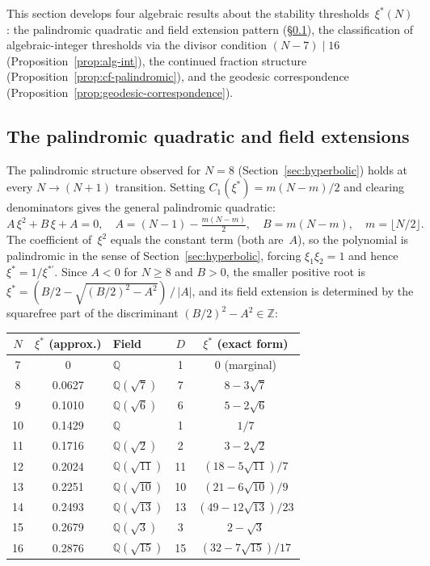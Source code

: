 This section develops four algebraic results about the
stability thresholds~$\xi^*(N)$: the palindromic quadratic
and field extension pattern (\S\ref{sec:palindromic-quad}),
the classification of algebraic-integer thresholds
via the divisor condition $(N{-}7)\mid 16$
(Proposition~\ref{prop:alg-int}),
the continued fraction structure
(Proposition~\ref{prop:cf-palindromic}),
and the geodesic correspondence
(Proposition~\ref{prop:geodesic-correspondence}).

\subsection{The palindromic quadratic and field extensions}
\label{sec:palindromic-quad}

The palindromic structure observed for $N = 8$
(Section~\ref{sec:hyperbolic}) holds at every
$N \to (N{+}1)$ transition.
Setting $C_1(\xi^*) = m(N{-}m)/2$ and clearing
denominators gives the general palindromic quadratic:
\begin{equation}\label{eq:palindromic}
  A\,\xi^2 + B\,\xi + A = 0,
  \quad
  A = (N{-}1) - \tfrac{m(N{-}m)}{2},
  \quad
  B = m(N{-}m),
  \quad
  m = \lfloor N/2\rfloor.
\end{equation}
The coefficient of~$\xi^2$ equals the constant term (both are~$A$),
so the polynomial is palindromic in the sense of
Section~\ref{sec:hyperbolic}, forcing
$\xi_1\xi_2 = 1$ and hence $\xi^* = 1/\xi^{*\prime}$.
Since $A < 0$ for $N \ge 8$ and $B > 0$, the smaller positive root is
$\xi^* = (B/2 - \sqrt{(B/2)^2 - A^2})\,/\,|A|$, and its field extension
is determined by the squarefree part of the discriminant
$(B/2)^2 - A^2 \in \mathbb{Z}$:

\begin{center}
\begin{tabular}{cclcc}
\toprule
$N$ & $\xi^*$ (approx.) & Field & $D$ & $\xi^*$ (exact form) \\
\midrule
7  & 0 & $\mathbb{Q}$ & 1 & $0$ (marginal) \\
8  & 0.0627 & $\mathbb{Q}(\sqrt{7})$ & 7 & $8 - 3\sqrt{7}$ \\
9  & 0.1010 & $\mathbb{Q}(\sqrt{6})$ & 6 & $5 - 2\sqrt{6}$ \\
10 & 0.1429 & $\mathbb{Q}$ & 1 & $1/7$ \\
11 & 0.1716 & $\mathbb{Q}(\sqrt{2})$ & 2 & $3 - 2\sqrt{2}$ \\
12 & 0.2024 & $\mathbb{Q}(\sqrt{11})$ & 11 & $(18 - 5\sqrt{11})/7$ \\
13 & 0.2251 & $\mathbb{Q}(\sqrt{10})$ & 10 & $(21 - 6\sqrt{10})/9$ \\
14 & 0.2493 & $\mathbb{Q}(\sqrt{13})$ & 13 & $(49 - 12\sqrt{13})/23$ \\
15 & 0.2679 & $\mathbb{Q}(\sqrt{3})$ & 3 & $2 - \sqrt{3}$ \\
16 & 0.2876 & $\mathbb{Q}(\sqrt{15})$ & 15 & $(32 - 7\sqrt{15})/17$ \\
\bottomrule
\end{tabular}
\end{center}

